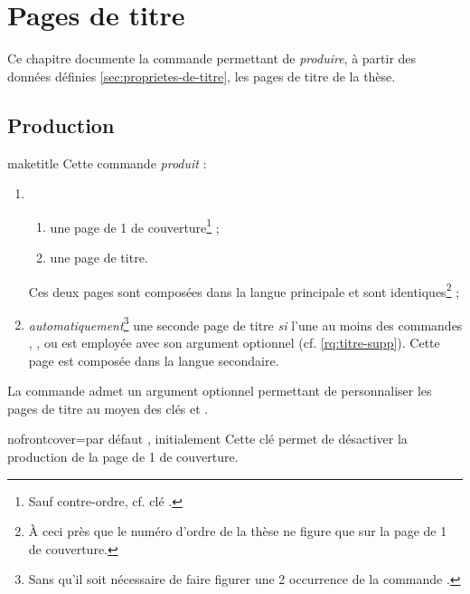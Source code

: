 \chapter{Pages de titre}\label{cha:pages-de-titre}

Ce chapitre documente la commande  permettant de
\emph{produire}, à partir des données définies \vref{sec:proprietes-de-titre},
les pages de titre de la thèse.

\section{Production}

\begin{docCommand}[doc description=\mandatory]{maketitle}{}
  Cette commande \emph{produit} :
  \begin{enumerate}
  \item
    \begin{enumerate}
    \item une page de 1\iere{} de couverture\footnote{Sauf contre-ordre,
        cf. clé .} ;
    \item une page de titre.
    \end{enumerate}
    Ces deux pages sont composées dans la langue principale et
    sont identiques\footnote{À ceci près que le numéro d'ordre de la thèse ne figure
      que sur la page de 1\iere{} de couverture.} ;
  \item \emph{automatiquement}\footnote{Sans qu'il soit nécessaire de faire
      figurer une 2\ieme{} occurrence de la commande .} une
    seconde page de titre \emph{si}  l'une au moins des
    commandes , ,  ou
     est employée avec son argument optionnel
    (cf. \vref{rq:titre-supp}). Cette page est composée dans la langue
    secondaire.
  \end{enumerate}
\end{docCommand}

La commande  admet un argument optionnel permettant de
personnaliser les pages de titre au moyen des clés  et
.%

\begin{docKey}{nofrontcover}{=\textbar{}}{par défaut
    , initialement }
  Cette clé permet de désactiver la production de la page de 1\iere{} de
  couverture.
\end{docKey}


